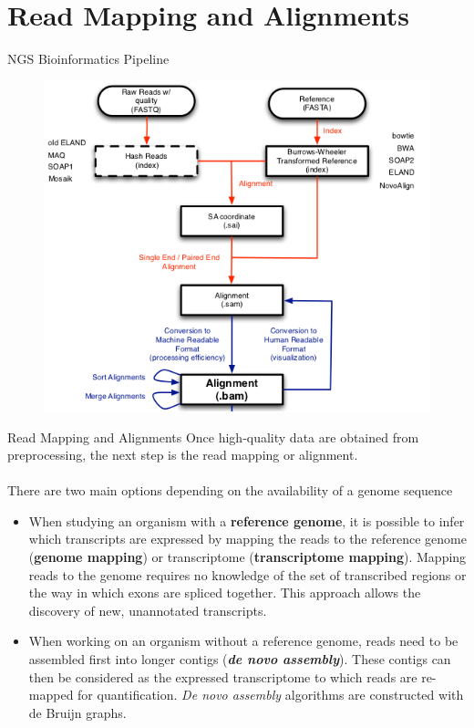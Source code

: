 \documentclass{if-beamer}
\begin{document}
\section{Read Mapping and Alignments}
\begin{frame}{NGS Bioinformatics Pipeline}
\begin{figure}
\centering
\includegraphics[scale=0.6]{ngs_scheme.png}
\end{figure}
\end{frame}
\begin{frame}{Read Mapping and Alignments}
Once high-quality data are obtained from preprocessing, the next step is the read mapping or alignment. 
\\~\\
There are two main options depending on the availability of a genome sequence
\begin{itemize}
    \item When studying an organism with a \textbf{reference genome}, it is possible to infer which transcripts are expressed by mapping the reads to the reference genome (\textbf{genome mapping}) or transcriptome (\textbf{transcriptome mapping}). Mapping reads to the genome requires no knowledge of the set of transcribed regions or the way in which exons are spliced together. This approach allows the discovery of new, unannotated transcripts.
    \item When working on an organism without a reference genome, reads need to be assembled first into longer contigs (\textbf{\textit{de novo assembly}}). These contigs can then be considered as the expressed transcriptome to which reads are re-mapped for quantification. \textit{De novo assembly} algorithms are constructed with de Bruijn graphs.
\end{itemize} 
\end{frame}
\end{document}
